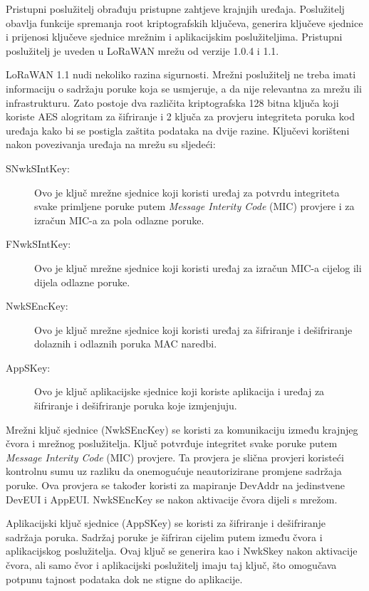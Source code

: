 \documentclass[times, utf8, diplomski]{fer}
\begin{document}
Pristupni poslužitelj obrađuju pristupne zahtjeve krajnjih uređaja. Poslužitelj obavlja funkcije spremanja root kriptografskih ključeva, generira ključeve sjednice i prijenosi ključeve sjednice mrežnim i aplikacijskim poslužiteljima. Pristupni poslužitelj je uveden u LoRaWAN mrežu od verzije 1.0.4 i 1.1.

LoRaWAN 1.1 nudi nekoliko razina sigurnosti. Mrežni poslužitelj ne treba imati informaciju o sadržaju poruke koja se usmjeruje, a da nije relevantna za mrežu ili infrastrukturu. Zato postoje dva različita kriptografska 128 bitna ključa koji koriste AES alogritam za šifriranje i 2 ključa za provjeru integriteta poruka kod uređaja kako bi se postigla zaštita podataka na dvije razine. Ključevi korišteni nakon povezivanja uređaja na mrežu su sljedeći:
\begin{description}
    \item[SNwkSIntKey:]Ovo je ključ mrežne sjednice koji koristi uređaj za potvrdu integriteta svake primljene poruke putem \emph{Message Interity Code} (MIC) provjere i za izračun MIC-a za pola odlazne poruke.
    \item[FNwkSIntKey:]Ovo je ključ mrežne sjednice koji koristi uređaj za izračun MIC-a cijelog ili dijela odlazne poruke.
    \item[NwkSEncKey:]Ovo je ključ mrežne sjednice koji koristi uređaj za šifriranje i dešifriranje dolaznih i odlaznih poruka MAC naredbi.
    \item[AppSKey:]Ovo je ključ aplikacijske sjednice koji koriste aplikacija i uređaj za šifriranje i dešifriranje poruka koje izmjenjuju.
\end{description}
Mrežni ključ sjednice (NwkSEncKey) se koristi za komunikaciju između krajnjeg čvora i mrežnog poslužitelja. Ključ potvrđuje integritet svake poruke putem \emph{Message Interity Code} (MIC) provjere. Ta provjera je slična provjeri koristeći kontrolnu sumu uz razliku da onemogućuje neautorizirane promjene sadržaja poruke. Ova provjera se također koristi za mapiranje DevAddr na jedinstvene DevEUI i AppEUI. NwkSEncKey se nakon aktivacije čvora dijeli s mrežom.

Aplikacijski ključ sjednice (AppSKey) se koristi za šifriranje i dešifriranje sadržaja poruka. Sadržaj poruke je šifriran cijelim putem između čvora i aplikacijskog poslužitelja. Ovaj ključ se generira kao i NwkSkey nakon aktivacije čvora, ali samo čvor i aplikacijski poslužitelj imaju taj ključ, što omogučava potpunu tajnost podataka dok ne stigne do aplikacije.
\end{document}

